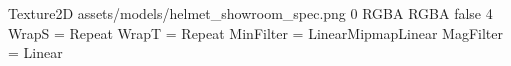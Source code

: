 Texture2D
assets/models/helmet_showroom_spec.png
0
RGBA
RGBA
false
4
WrapS = Repeat
WrapT = Repeat
MinFilter = LinearMipmapLinear
MagFilter = Linear
